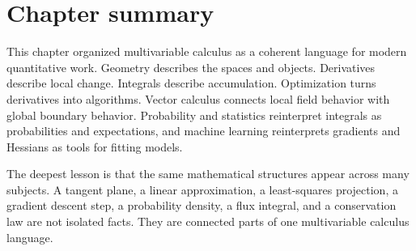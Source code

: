 \documentclass[11pt]{article}
\begin{document}
\section*{Chapter summary}

\begin{summarybox}
This chapter organized multivariable calculus as a coherent language for modern quantitative work. Geometry describes the spaces and objects. Derivatives describe local change. Integrals describe accumulation. Optimization turns derivatives into algorithms. Vector calculus connects local field behavior with global boundary behavior. Probability and statistics reinterpret integrals as probabilities and expectations, and machine learning reinterprets gradients and Hessians as tools for fitting models.

The deepest lesson is that the same mathematical structures appear across many subjects. A tangent plane, a linear approximation, a least-squares projection, a gradient descent step, a probability density, a flux integral, and a conservation law are not isolated facts. They are connected parts of one multivariable calculus language.
\end{summarybox}
\end{document}

